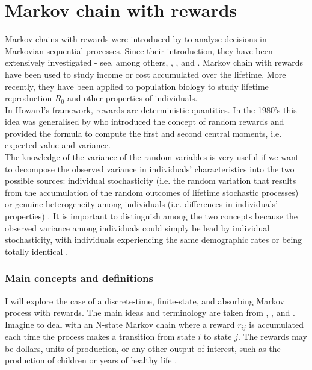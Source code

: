 \documentclass[\main/main.tex]{subfiles}
\begin{document}
\section{Markov chain with rewards}

Markov chains with rewards were introduced by \cite{Howard1960} to analyse decisions in Markovian sequential processes. Since their introduction, they have been extensively investigated - see, among others, \cite{Howard1960}, \cite{Puterman1994}, and \cite{Sheskin2010}. Markov  chain  with  rewards have been used to study income or cost accumulated over the lifetime. More recently, they have been applied to population biology to study lifetime reproduction $R_0$ \citep{Caswell2011, VanDaalen2015, VanDaalen2017} and other properties of individuals.\\

In Howard's framework, rewards are deterministic quantities. In the 1980's this idea was generalised by \cite{Benito1982} who introduced the concept of random rewards and provided the formula to compute the first and second central moments, i.e. expected value and variance.\\
The knowledge of the variance of the random variables is very useful if we want to decompose the observed variance in individuals' characteristics into the two possible sources: individual stochasticity (i.e. the random variation that results from the accumulation of the random outcomes of lifetime stochastic processes) or genuine heterogeneity among individuals (i.e. differences in individuals' properties) \citep{Hartemink2017a, Caswell2011}.
It is important to distinguish among the two concepts because the observed variance among individuals could simply be lead by individual stochasticity, with individuals experiencing the same demographic rates or being totally identical \citep{VanDaalen2017}.





\subsubsection{Main concepts and definitions}
I will explore the case of a discrete-time, finite-state, and absorbing Markov process with rewards. The main ideas and terminology are taken from \cite{Howard1960}, \cite{Caswell2011}, and \cite{VanDaalen2017}.\\

\noindent Imagine to deal with an N-state Markov chain where a reward $r_{ij}$ is accumulated each time the process makes a transition from state $i$ to state $j$. The rewards may be dollars, units of production, or any other output of interest, such as the production of children \citep{Caswell2011, VanDaalen2015, VanDaalen2017} or years of healthy life \citep{Caswell2018}.
\end{document}
